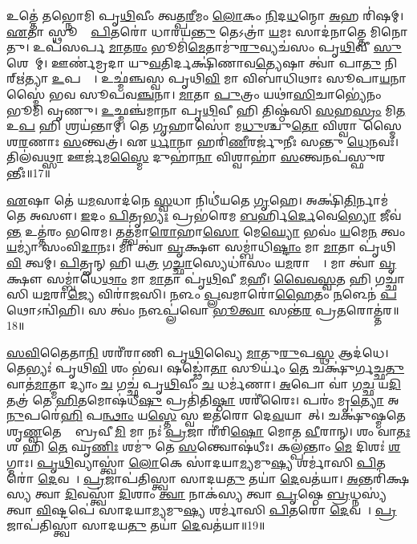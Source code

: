 𑌉𑌤𑍍𑌤𑍇॑ 𑌤𑌭𑍍𑌨𑍋𑌮𑌿 𑌪𑍃\ul{𑌥𑌿}𑌵𑍀𑌂 𑌤𑍍𑌵𑌤𑍍𑌪\ul{𑌰𑍀}𑌮𑌂 \ul{𑌲𑍋}𑌕𑌂 \ul{𑌨𑌿}𑌦\ul{𑌧}𑌨𑍍𑌮𑍋 \ul{𑌅}𑌹 𑌰𑌿॑𑌷𑌮𑍍। 
\ul{𑌏}𑌤𑌾 𑌸𑍍𑌥𑍂𑌣𑌾𑌂᳚ \ul{𑌪𑌿}𑌤𑌰𑍋॑ 𑌧𑌾𑌰𑌯\ul{𑌨𑍍𑌤𑍁} 𑌤𑍇𑌽𑌤𑍍𑌰𑌾॑ \ul{𑌯}𑌮𑌃 𑌸𑌾𑌦॑𑌨𑌾𑌤𑍍𑌤𑍇 𑌮𑌿𑌨𑍋𑌤𑍁। 
𑌉𑌪॑𑌸𑌰𑍍𑌪 \ul{𑌮𑌾}𑌤\ul{𑌰𑌂} 𑌭𑍂𑌮𑌿॑\ul{𑌮𑍇}𑌤𑌾𑌮𑍁॑\ul{𑌰𑍁}𑌵𑍍𑌯𑌚॑𑌸𑌂 𑌪𑍃\ul{𑌥𑌿}𑌵𑍀 \ul{𑌸𑍁}𑌶𑍇𑌵𑌾᳚𑌮𑍍। 
𑌊𑌰𑍍𑌣॑𑌮𑍍𑌰𑌦𑌾 𑌯𑍁\ul{𑌵}𑌤𑌿𑌰𑍍𑌦𑌕𑍍𑌷𑌿॑𑌣𑌾𑌵\ul{𑌤𑍍𑌯𑍇}𑌷𑌾 𑌤𑍍𑌵𑌾॑ 𑌪𑌾\ul{𑌤𑍁} 𑌨𑌿𑌰𑍍\mbox{}𑌋॑𑌤𑍍𑌯𑌾 \ul{𑌉}𑌪𑌸𑍍𑌥𑍇᳚। 
𑌉𑌛𑍍𑌮॑𑌞𑍍𑌚𑌸𑍍𑌵 𑌪𑍃𑌥𑌿\ul{𑌵𑌿} 𑌮𑌾 𑌵𑌿𑌬𑌾॑𑌧𑌿𑌥𑌾𑌃 𑌸𑍂𑌪𑌾\ul{𑌯}𑌨𑌾𑌸𑍍𑌮𑍈॑ 𑌭𑌵 𑌸𑍂𑌪𑌵\ul{𑌞𑍍𑌚}𑌨𑌾। 
\ul{𑌮𑌾}𑌤𑌾 \ul{𑌪𑍁}𑌤𑍍𑌰𑌂 𑌯𑌥𑌾॑\ul{𑌸𑌿}𑌚𑌾𑌭𑍍𑌯𑍇॑𑌨𑌂 𑌭𑍂𑌮𑌿 𑌵𑍃𑌣𑍁। 
\ul{𑌉}𑌛𑍍𑌮𑌞𑍍𑌚॑𑌮𑌾𑌨𑌾 𑌪𑍃\ul{𑌥𑌿}𑌵𑍀 𑌹𑌿 𑌤𑌿𑌷𑍍𑌠॑𑌸𑌿 \ul{𑌸}𑌹\ul{𑌸𑍍𑌰𑌂} 𑌮𑌿\ul{𑌤} 𑌉\ul{𑌪} 𑌹𑌿 𑌶𑍍𑌰𑌯॑𑌨𑍍𑌤𑌾𑌮𑍍। 
𑌤𑍇 \ul{𑌗𑍃}𑌹𑌾𑌸𑍋॑ 𑌮\ul{𑌧𑍁}𑌶𑍍𑌚𑍁\ul{𑌤𑍋} 𑌵𑌿𑌶𑍍𑌵𑌾𑌹𑌾᳚𑌸𑍍𑌮𑍈 𑌶\ul{𑌰}𑌣𑌾𑌃 \ul{𑌸}𑌨𑍍𑌤𑍍𑌵𑌤𑍍𑌰॑। 
𑌏𑌣𑍀᳚\ul{𑌰𑍍𑌧𑌾}𑌨𑌾 𑌹𑌰𑌿॑\ul{𑌣𑍀}𑌰𑌰𑍍𑌜𑍁॑𑌨𑍀𑌃 𑌸𑌨𑍍𑌤𑍁 \ul{𑌧𑍇}𑌨𑌵𑌃॑। 
𑌤𑌿𑌲॑𑌵\ul{𑌥𑍍𑌸𑌾} 𑌊𑌰𑍍𑌜॑𑌮\ul{𑌸𑍍𑌮𑍈} 𑌦𑍁𑌹𑌾॑\ul{𑌨𑌾} 𑌵𑌿𑌶𑍍𑌵𑌾𑌹𑌾॑ \ul{𑌸}𑌨𑍍𑌤𑍍𑌵𑌨𑌪॑𑌸𑍍𑌫𑍁𑌰𑌨𑍍𑌤𑍀𑌃॥17॥

\ul{𑌏}𑌷𑌾 𑌤𑍇॑ 𑌯\ul{𑌮}𑌸𑌾𑌦॑𑌨𑍇 \ul{𑌸𑍍𑌵}𑌧𑌾 𑌨𑌿𑌧𑍀॑𑌯𑌤𑍇 \ul{𑌗𑍃}𑌹𑍇। 
𑌅𑌕𑍍𑌷𑌿॑\ul{𑌤𑌿}𑌰𑍍𑌨𑌾𑌮॑ 𑌤𑍇 𑌅𑌸𑍗। 
\ul{𑌇}𑌦𑌂 \ul{𑌪𑌿}𑌤𑍃\ul{𑌭𑍍𑌯𑌃} 𑌪𑍍𑌰𑌭॑𑌰𑍇𑌮 \ul{𑌬}𑌰𑍍\mbox{}𑌹𑌿\ul{𑌰𑍍𑌦𑍇}𑌵𑍇\ul{𑌭𑍍𑌯𑍋} 𑌜𑍀𑌵॑\ul{𑌨𑍍𑌤} 𑌉𑌤𑍍𑌤॑𑌰𑌂 𑌭𑌰𑍇𑌮। 
𑌤𑌤𑍍𑌤𑍍𑌵॑𑌮𑌾\ul{𑌰𑍋}𑌹𑌾\ul{𑌸𑍋} 𑌮𑍇\ul{𑌘𑍍𑌯𑍋} 𑌭𑌵𑌂॑ \ul{𑌯}𑌮𑍇\ul{𑌨} 𑌤𑍍𑌵𑌂 \ul{𑌯}𑌮𑍍𑌯𑌾॑ 𑌸𑌂𑌵𑌿\ul{𑌦𑌾}𑌨𑌃। 
𑌮𑌾 𑌤𑍍𑌵𑌾॑ \ul{𑌵𑍃}𑌕𑍍𑌷𑍗 𑌸𑌮𑍍𑌬𑌾॑𑌧𑌿\ul{𑌷𑍍𑌟𑌾𑌂} 𑌮𑌾 \ul{𑌮𑌾}𑌤𑌾 𑌪𑍃॑𑌥𑌿\ul{𑌵𑌿} 𑌤𑍍𑌵𑌮𑍍। 
\ul{𑌪𑌿}𑌤𑍄𑌨𑍍 𑌹𑌿 𑌯\ul{𑌤𑍍𑌰} 𑌗\ul{𑌚𑍍𑌛𑌾}𑌸𑍍𑌯𑍇𑌧𑌾॑𑌸𑌂 𑌯\ul{𑌮}𑌰𑌾𑌜𑍍𑌯𑍇᳚। 
𑌮𑌾 𑌤𑍍𑌵𑌾॑ \ul{𑌵𑍃}𑌕𑍍𑌷𑍗 𑌸𑌮𑍍𑌬𑌾॑𑌧𑍇\ul{𑌥𑌾𑌂} 𑌮𑌾 \ul{𑌮𑌾}𑌤𑌾 𑌪𑍃॑\ul{𑌥𑌿}𑌵𑍀 \ul{𑌮}𑌹𑍀। 
\ul{𑌵𑍈}\ul{𑌵}\ul{𑌸𑍍𑌵}𑌤 𑌹𑌿 𑌗𑌚𑍍𑌛𑌾॑𑌸𑌿 𑌯\ul{𑌮}𑌰𑌾\ul{𑌜𑍍𑌯𑍇} 𑌵𑌿𑌰𑌾॑𑌜𑌸𑌿। 
\ul{𑌨}𑌳𑌂 \ul{𑌪𑍍𑌲}𑌵𑌮𑌾𑌰𑍋॑\ul{𑌹𑍈}𑌤𑌂 \ul{𑌨}𑌳𑍇𑌨॑ \ul{𑌪}𑌥𑍋𑌽𑌨𑍍𑌵𑌿॑𑌹𑌿। 
𑌸 𑌤𑍍𑌵𑌂॑ \ul{𑌨}𑌳𑌪𑍍𑌲॑𑌵𑍋 \ul{𑌭𑍂}\ul{𑌤𑍍𑌵𑌾} 𑌸𑌨𑍍𑌤॑\ul{𑌰} 𑌪𑍍𑌰\ul{𑌤}𑌰𑍋𑌤𑍍𑌤॑𑌰॥18॥

\ul{𑌸}\ul{𑌵𑌿}𑌤𑍈𑌤𑌾\ul{𑌨𑌿} 𑌶𑌰𑍀॑𑌰𑌾𑌣𑌿 𑌪𑍃\ul{𑌥𑌿}𑌵𑍍𑌯𑍈 \ul{𑌮𑌾}𑌤𑍁\ul{𑌰𑍁}𑌪\ul{𑌸𑍍𑌥} 𑌆𑌦॑𑌧𑍇। 
𑌤𑍇𑌭𑍍𑌯𑌃॑ 𑌪𑍃𑌥𑌿\ul{𑌵𑌿} 𑌶𑌂 𑌭॑𑌵। 
𑌷𑌡𑍍𑌢𑍋॑\ul{𑌤𑌾} 𑌸𑍂𑌰𑍍𑌯𑌂॑ \ul{𑌤𑍇} 𑌚𑌕𑍍𑌷𑍁॑𑌰𑍍𑌗𑌚𑍍𑌛\ul{𑌤𑍁} 𑌵𑌾𑌤॑\ul{𑌮𑌾}𑌤𑍍𑌮𑌾 𑌦𑍍𑌯𑌾𑌂 \ul{𑌚} 𑌗𑌚𑍍𑌛॑ 𑌪𑍃\ul{𑌥𑌿}𑌵𑍀𑌂 \ul{𑌚} 𑌧𑌰𑍍𑌮॑𑌣𑌾। 
\ul{𑌅}𑌪𑍋 𑌵𑌾॑ 𑌗\ul{𑌚𑍍𑌛} 𑌯\ul{𑌦𑌿} 𑌤𑌤𑍍𑌰॑ 𑌤𑍇 \ul{𑌹𑌿}𑌤𑌮𑍋𑌷॑𑌧𑍀\ul{𑌷𑍁} 𑌪𑍍𑌰𑌤𑌿॑𑌤𑌿\ul{𑌷𑍍𑌠𑌾} 𑌶𑌰𑍀॑𑌰𑍈𑌃। 
𑌪𑌰𑌂॑ 𑌮𑍃\ul{𑌤𑍍𑌯𑍋} 𑌅\ul{𑌨𑍁}𑌪𑌰𑍇॑\ul{𑌹𑌿} 𑌪\ul{𑌨𑍍𑌥𑌾𑌂} 𑌯\ul{𑌸𑍍𑌤𑍇} 𑌸𑍍𑌵 𑌇𑌤॑𑌰𑍋 𑌦𑍇\ul{𑌵}𑌯𑌾𑌨𑌾᳚𑌤𑍍। 
𑌚𑌕𑍍𑌷𑍁॑𑌷𑍍𑌮𑌤𑍇 𑌶𑍃\ul{𑌣𑍍𑌵}𑌤𑍇 𑌤𑍇᳚ 𑌬𑍍𑌰𑌵𑍀\ul{𑌮𑌿} 𑌮𑌾 𑌨𑌃॑ \ul{𑌪𑍍𑌰}𑌜𑌾 𑌰𑍀॑𑌰𑌿\ul{𑌷𑍋} 𑌮𑍋𑌤 \ul{𑌵𑍀}𑌰𑌾𑌨𑍍। 
𑌶𑌂 𑌵𑌾\ul{𑌤𑌃} 𑌶 𑌹𑌿 \ul{𑌤𑍇} 𑌘𑍃\ul{𑌣𑌿𑌃} 𑌶𑌮𑍁॑ 𑌤𑍇 \ul{𑌸}𑌨𑍍𑌤𑍍𑌵𑍋𑌷॑𑌧𑍀𑌃। 
𑌕𑌲𑍍𑌪॑𑌨𑍍𑌤𑌾𑌂 \ul{𑌮𑍇} 𑌦𑌿𑌶𑌃॑ \ul{𑌶}𑌗𑍍𑌮𑌾𑌃। 
\ul{𑌪𑍃}\ul{𑌥𑌿}𑌵𑍍𑌯𑌾𑌸𑍍𑌤𑍍𑌵𑌾॑ \ul{𑌲𑍋}𑌕𑍇 𑌸𑌾॑𑌦𑌯𑌾\ul{𑌮𑍍𑌯}𑌮𑍁\ul{𑌷𑍍𑌯} 𑌶𑌰𑍍𑌮𑌾॑𑌸𑌿 \ul{𑌪𑌿}𑌤𑌰𑍋॑ \ul{𑌦𑍇}𑌵𑌤𑌾᳚। 
\ul{𑌪𑍍𑌰}𑌜𑌾𑌪॑𑌤𑌿𑌸𑍍𑌤𑍍𑌵𑌾 𑌸𑌾𑌦𑌯\ul{𑌤𑍁} 𑌤𑌯𑌾॑ \ul{𑌦𑍇}𑌵𑌤॑𑌯𑌾। 
\ul{𑌅}𑌨𑍍𑌤𑌰𑌿॑𑌕𑍍𑌷𑌸𑍍𑌯 𑌤𑍍𑌵𑌾 \ul{𑌦𑌿}𑌵𑌸𑍍𑌤𑍍𑌵𑌾॑ \ul{𑌦𑌿}𑌶𑌾𑌂 \ul{𑌤𑍍𑌵𑌾} 𑌨𑌾𑌕॑𑌸𑍍𑌯 𑌤𑍍𑌵𑌾 \ul{𑌪𑍃}𑌷𑍍𑌠𑍇 \ul{𑌬𑍍𑌰}𑌧𑍍𑌨𑌸𑍍𑌯॑ 𑌤𑍍𑌵𑌾 \ul{𑌵𑌿}𑌷𑍍𑌟𑌪𑍇॑ 𑌸𑌾𑌦𑌯𑌾\ul{𑌮𑍍𑌯}𑌮𑍁\ul{𑌷𑍍𑌯} 𑌶𑌰𑍍𑌮𑌾॑𑌸𑌿 \ul{𑌪𑌿}𑌤𑌰𑍋॑ \ul{𑌦𑍇}𑌵𑌤𑌾᳚। 
\ul{𑌪𑍍𑌰}𑌜𑌾𑌪॑𑌤𑌿𑌸𑍍𑌤𑍍𑌵𑌾 𑌸𑌾𑌦𑌯\ul{𑌤𑍁} 𑌤𑌯𑌾॑ \ul{𑌦𑍇}𑌵𑌤॑𑌯𑌾॥19॥

